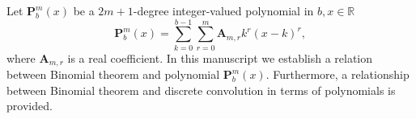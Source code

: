 Let $\mathbf{P}^{m}_{b}(x)$ be a $2m+1$-degree integer-valued polynomial in $b,x\in\mathbb{R}$
\[
    \mathbf{P}^{m}_{b}(x) = \sum_{k=0}^{b-1} \sum_{r=0}^{m} \mathbf{A}_{m,r} k^r(x-k)^r,
\]
where $\mathbf{A}_{m,r}$ is a real coefficient.
In this manuscript we establish a relation between Binomial theorem and polynomial $\mathbf{P}^{m}_{b}(x)$.
Furthermore, a relationship between Binomial theorem and discrete convolution in terms of polynomials is provided.